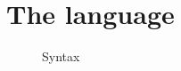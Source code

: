 \section{The \lang language}

\begin{figure*}[h]
  \centering
  
  \caption{Syntax}
\end{figure*}
%   
  


